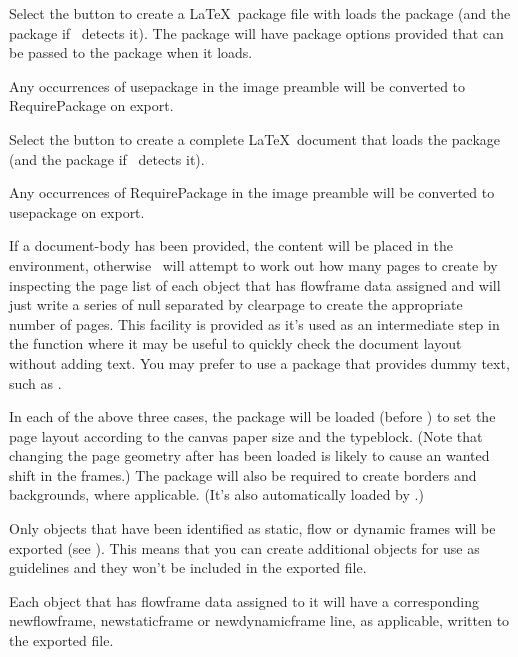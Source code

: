 
Select the  button to create a \LaTeX\ package
file with loads the  package (and the
 package if \FlowframTk\ detects it).
The package will have package options provided that can be passed to the
 package when it loads.

Any occurrences of \gls{usepackage} in the image
preamble will be converted to \gls{RequirePackage} on export.


Select the  button to create a complete
\LaTeX\ document that loads the  package (and the
 package if \FlowframTk\ detects it).

Any occurrences of \gls{RequirePackage} in the image
preamble will be converted to \gls{usepackage} on export.

If a \gls{document-body} has been provided, the content will be
placed in the  environment,
otherwise \FlowframTk\ will attempt to work out how many pages to
create by inspecting the page list of each \gls{object} that has
\gls{flowframe} data assigned and will just write a series of
\gls{null} separated by \gls{clearpage} to create the appropriate
number of pages. This facility is provided as it's used as an
intermediate step in the  function where it
may be useful to quickly check the document layout without adding
text. You may prefer to use a package that provides dummy text, such
as .

In each of the above three cases, the  package will be
loaded (before ) to set the page layout according to
the \gls{canvas} paper size and the \gls{typeblock}. (Note that
changing the page geometry after  has been loaded is
likely to cause an wanted shift in the frames.)
The  package will also be
required to create borders and backgrounds, where applicable.
(It's also automatically loaded by .)

Only \glspl{object} that have been identified as static, flow or
dynamic frames will be exported (see ).
This means that you can create additional \glspl{object} for use as
guidelines and they won't be included in the exported file.

Each \gls{object} that has \gls{flowframe} data
assigned to it will have a corresponding \gls{newflowframe},
\gls{newstaticframe} or \gls{newdynamicframe} line, as applicable,
written to the exported file.

